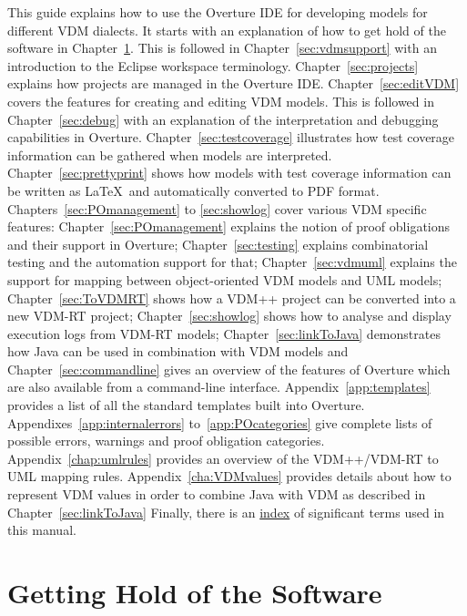 \documentclass{overturerepchap}
\begin{document}
This guide explains how to use the Overture IDE for developing models
for different VDM dialects. It starts with an explanation
of how to get hold of the software in
Chapter~\ref{sec:install}. This is followed in
Chapter~\ref{sec:vdmsupport} with an introduction to the Eclipse
workspace terminology. Chapter~\ref{sec:projects} explains how
projects are managed in the Overture IDE. Chapter~\ref{sec:editVDM}
covers the features for creating and editing VDM models. This is
followed in Chapter~\ref{sec:debug} with an explanation of the
interpretation and debugging capabilities in Overture.
Chapter~\ref{sec:testcoverage} illustrates how test coverage
information can be gathered when models are interpreted.
Chapter~\ref{sec:prettyprint} shows how models with test
coverage information can be written as
\LaTeX\ and automatically converted to PDF format.
Chapters~\ref{sec:POmanagement} to \ref{sec:showlog} cover various
VDM specific features: Chapter~\ref{sec:POmanagement}
explains the notion of proof obligations and their support in
Overture; Chapter~\ref{sec:testing} explains
combinatorial testing and the automation support for that;
Chapter~\ref{sec:vdmuml} explains the support for mapping between
object-oriented VDM models and UML models; Chapter~\ref{sec:ToVDMRT}
shows how a VDM++ project can be
converted into a new VDM-RT project; Chapter~\ref{sec:showlog} shows
how to analyse and display execution logs from VDM-RT models; 
Chapter~\ref{sec:linkToJava} demonstrates how Java can be used in 
combination with VDM models and
Chapter~\ref{sec:commandline} gives an
overview of the features of Overture which are also available from
a command-line interface. Appendix~\ref{app:templates} provides a list
of all the standard templates built into Overture.
Appendixes~\ref{app:internalerrors}
to~\ref{app:POcategories} give complete lists of possible errors,
warnings and proof obligation categories. Appendix~\ref{chap:umlrules} provides
an overview of the VDM++/VDM-RT to UML mapping rules. 
Appendix~\ref{cha:VDMvalues} provides details about how to represent VDM 
values in order to combine Java with VDM as described in Chapter~\ref{sec:linkToJava}
Finally, there is an \hyperref[sec:index]{index} of significant terms used in this
manual.


\chapter{Getting Hold of the Software}\label{sec:install}
\end{document}
